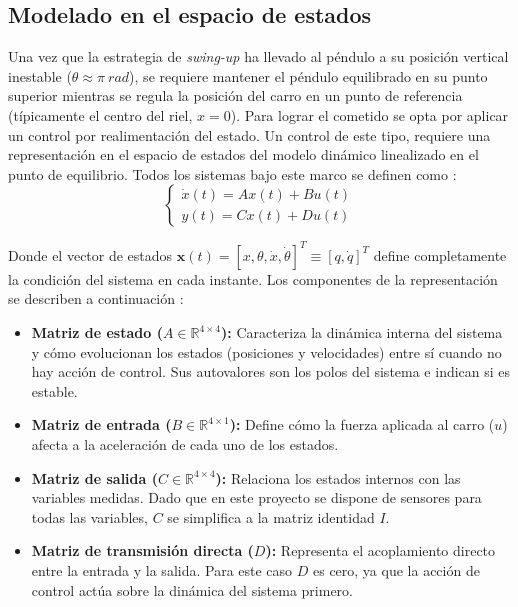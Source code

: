 \documentclass[11pt,fleqn]{book} %
\begin{document}
 \newpage
\subsection{Modelado en el espacio de estados}

Una vez que la estrategia de \textit{swing-up} ha llevado al péndulo a su posición vertical inestable ($\theta \approx \pi\ rad$), se requiere mantener el péndulo equilibrado en su punto superior mientras se regula la posición del carro en un punto de referencia (típicamente el centro del riel, $x = 0$). Para lograr el cometido se opta por aplicar un control por realimentación del estado. Un control de este tipo, requiere una representación en el espacio de estados del modelo dinámico linealizado en el punto de equilibrio. Todos los sistemas bajo este marco se definen como \cite{Penarrocha_Tema7}:
\begin{equation}
	\begin{cases}
		\dot{x}(t) = Ax(t) + Bu(t) \\
		y(t) = Cx(t) + Du(t)
	\end{cases}\label{eq:def_espacio_estados}
\end{equation}

Donde el vector de estados $\mathbf{x}(t) = [x, \theta, \dot{x}, \dot{\theta}]^T \equiv [q, \dot{q}]^T$ define completamente la condición del sistema en cada instante. Los componentes de la representación se describen a continuación \cite{Penarrocha_Tema7}:
\begin{itemize}[]
	\item\textbf{ Matriz de estado ($A \in \mathbb{R}^{4 \times 4}$):} Caracteriza la dinámica interna del sistema y cómo evolucionan los estados (posiciones y velocidades) entre sí cuando no hay acción de control. Sus autovalores son los polos del sistema e indican si es estable.
	
	\item\textbf{ Matriz de entrada ($B \in \mathbb{R}^{4 \times 1}$):} Define cómo la fuerza aplicada al carro ($u$) afecta a la aceleración de cada uno de los estados.
	
	\item \textbf{Matriz de salida ($C \in \mathbb{R}^{4 \times 4}$):} Relaciona los estados internos con las variables medidas. Dado que en este proyecto se dispone de sensores para todas las variables, $C$ se simplifica a la matriz identidad $I$.
	
	\item \textbf{Matriz de transmisión directa ($D$):} Representa el acoplamiento directo entre la entrada y la salida. Para este caso $D$ es cero, ya que la acción de control actúa sobre la dinámica del sistema primero. 
\end{itemize}
\end{document}
